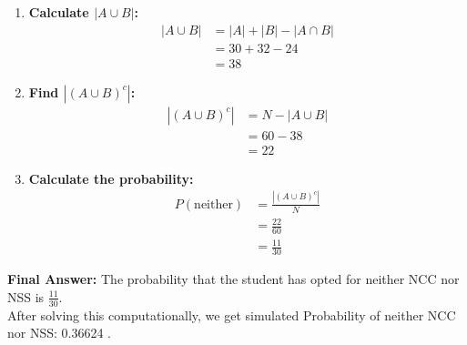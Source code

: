\documentclass[journal]{IEEEtran}
\begin{document}
\begin{enumerate}
    \item \textbf{Calculate $|A \cup B|$:}
    \begin{align*}
        |A \cup B| &= |A| + |B| - |A \cap B| \\
        &= 30 + 32 - 24 \\
        &= 38
    \end{align*}

    \item \textbf{Find $|(A \cup B)^c|$:}
    \begin{align*}
        |(A \cup B)^c| &= N - |A \cup B| \\
        &= 60 - 38 \\
        &= 22
    \end{align*}

    \item \textbf{Calculate the probability:}
    \begin{align*}
        P(\text{neither}) &= \frac{|(A \cup B)^c|}{N} \\
        &= \frac{22}{60} \\
        &= \frac{11}{30}
    \end{align*}
\end{enumerate}

\textbf{Final Answer:} The probability that the student has opted for neither NCC nor NSS is $\frac{11}{30}$. \\ 
After solving this computationally, we get simulated Probability of neither NCC nor NSS: 0.36624 .
 
\end{document}
